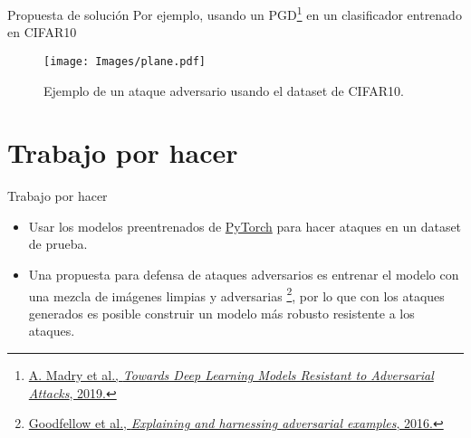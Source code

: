 \documentclass[10pt]{beamer}
\begin{document}
\begin{frame}{Propuesta de solución}
\justify	
\small
Por ejemplo, usando un PGD\footnote{\vspace*{0.3cm} \href{https://arxiv.org/pdf/1706.06083.pdf}{A. Madry et al., \emph{Towards Deep Learning Models Resistant to Adversarial
Attacks}, 2019.}} en un clasificador entrenado en CIFAR10

\begin{figure}
\centering
\texttt{[image: Images/plane.pdf]}
\caption{Ejemplo de un ataque adversario usando el dataset de CIFAR10.}
\end{figure}

\end{frame}

\section{Trabajo por hacer}
\begin{frame}{Trabajo por hacer}
\justify	
\small

\begin{itemize}
\item Usar los modelos preentrenados de \href{https://pytorch.org/vision/stable/models.html}{PyTorch} para hacer ataques en un dataset de prueba.

\item Una propuesta para defensa de ataques adversarios es entrenar el modelo con una mezcla de imágenes limpias y adversarias \footnote{\href{https://arxiv.org/pdf/1412.6572.pdf}{Goodfellow et al., \emph{\vspace*{0.3cm} Explaining and harnessing adversarial examples}, 2016.}}, por lo que con los ataques generados es posible construir un modelo más robusto resistente a los ataques.  
\end{itemize}

\end{frame}

%
%
%
%
\end{document}
